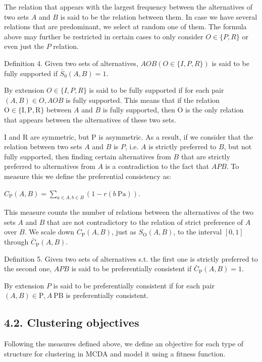 \documentclass[10pt]{article}
\begin{document}
The relation that appears with the largest frequency between the alternatives of two sets $A$ and $B$ is said to be the relation between them. In case we have several relations that are predominant, we select at random one of them. The formula above may further be restricted in certain cases to only consider $O \in\{P, R\}$ or even just the $P$ relation.

Definition 4. Given two sets of alternatives, $A O B(O \in\{I, P, R\})$ is said to be fully supported if $\bar{S}_{0}(A, B)=1$.

By extension $O \in\{I, P, R\}$ is said to be fully supported if for each pair $(A, B) \in O, A O B$ is fully supported. This means that if the relation $\mathrm{O} \in\{\mathrm{I}, \mathrm{P}, \mathrm{R}\}$ between $A$ and $B$ is fully supported, then $\mathrm{O}$ is the only relation that appears between the alternatives of these two sets.

$\mathrm{I}$ and $\mathrm{R}$ are symmetric, but $\mathrm{P}$ is asymmetric. As a result, if we consider that the relation between two sets $A$ and $B$ is $P$, i.e. $A$ is strictly preferred to $B$, but not fully supported, then finding certain alternatives from $B$ that are strictly preferred to alternatives from $A$ is a contradiction to the fact that $A P B$. To measure this we define the preferential consistency as:

$C_{\mathrm{P}}(A, B)=\sum_{a \in A, b \in B}(1-r(b \mathrm{~Pa}))$.

This measure counts the number of relations between the alternatives of the two sets $A$ and $B$ that are not contradictory to the relation of strict preference of $A$ over $B$. We scale down $C_{\mathrm{P}}(A, B)$, just as $S_{\mathrm{O}}(A, B)$, to the interval $[0,1]$ through $\bar{C}_{\mathrm{P}}(A, B)$.

Definition 5. Given two sets of alternatives s.t. the first one is strictly preferred to the second one, $A P B$ is said to be preferentially consistent if $\bar{C}_{\mathrm{P}}(A, B)=1$.

By extension $P$ is said to be preferentially consistent if for each pair $(A, B) \in \mathrm{P}, A \mathrm{~PB}$ is preferentially consistent.

\subsection*{4.2. Clustering objectives}
Following the measures defined above, we define an objective for each type of structure for clustering in MCDA and model it using a fitness function.
\end{document}
